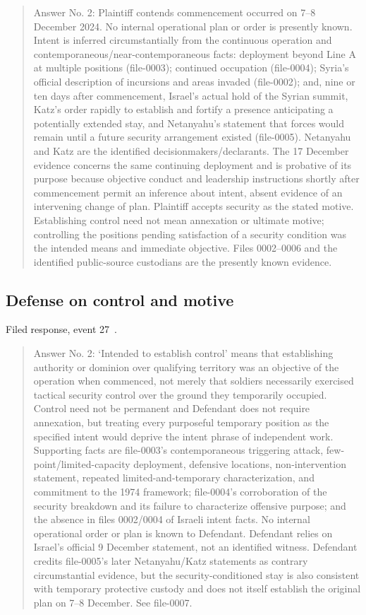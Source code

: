 \begin{quote}
Answer No. 2: Plaintiff contends commencement occurred on 7–8 December 2024. No internal operational plan or order is presently known. Intent is inferred circumstantially from the continuous operation and contemporaneous/near-contemporaneous facts: deployment beyond Line A at multiple positions (file-0003); continued occupation (file-0004); Syria's official description of incursions and areas invaded (file-0002); and, nine or ten days after commencement, Israel's actual hold of the Syrian summit, Katz's order rapidly to establish and fortify a presence anticipating a potentially extended stay, and Netanyahu's statement that forces would remain until a future security arrangement existed (file-0005). Netanyahu and Katz are the identified decisionmakers/declarants. The 17 December evidence concerns the same continuing deployment and is probative of its purpose because objective conduct and leadership instructions shortly after commencement permit an inference about intent, absent evidence of an intervening change of plan. Plaintiff accepts security as the stated motive. Establishing control need not mean annexation or ultimate motive; controlling the positions pending satisfaction of a security condition was the intended means and immediate objective. Files 0002–0006 and the identified public-source custodians are the presently known evidence.
\end{quote}

\subsection{Defense on control and motive}

Filed response, event 27~\cite{record}.

\begin{quote}
Answer No. 2: ‘Intended to establish control’ means that establishing authority or dominion over qualifying territory was an objective of the operation when commenced, not merely that soldiers necessarily exercised tactical security control over the ground they temporarily occupied. Control need not be permanent and Defendant does not require annexation, but treating every purposeful temporary position as the specified intent would deprive the intent phrase of independent work. Supporting facts are file-0003's contemporaneous triggering attack, few-point/limited-capacity deployment, defensive locations, non-intervention statement, repeated limited-and-temporary characterization, and commitment to the 1974 framework; file-0004's corroboration of the security breakdown and its failure to characterize offensive purpose; and the absence in files 0002/0004 of Israeli intent facts. No internal operational order or plan is known to Defendant. Defendant relies on Israel's official 9 December statement, not an identified witness. Defendant credits file-0005's later Netanyahu/Katz statements as contrary circumstantial evidence, but the security-conditioned stay is also consistent with temporary protective custody and does not itself establish the original plan on 7–8 December. See file-0007.
\end{quote}

